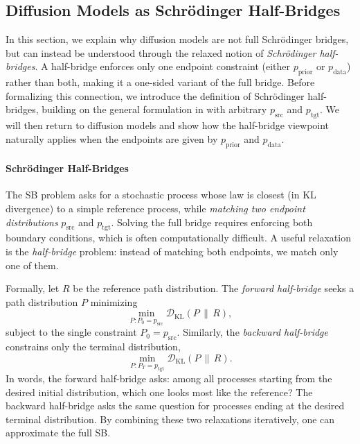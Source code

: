 
\subsection{Diffusion Models as Schrödinger Half-Bridges}

In this section, we explain why diffusion models are not full Schr\"odinger bridges, 
but can instead be understood through the relaxed notion of \emph{Schr\"odinger half-bridges}. 
A half-bridge enforces only one endpoint constraint (either $p_{\mathrm{prior}}$ or $p_{\mathrm{data}}$) rather than both, 
making it a one-sided variant of the full bridge. 
Before formalizing this connection, we introduce the definition of Schr\"odinger half-bridges, 
building on the general formulation in  with arbitrary $p_{\mathrm{src}}$ and $p_{\mathrm{tgt}}$. 
We will then return to diffusion models and show how the half-bridge viewpoint naturally applies when the 
endpoints are given by $p_{\mathrm{prior}}$ and $p_{\mathrm{data}}$.



\paragraph{Schrödinger Half-Bridges}

The SB problem asks for a stochastic process whose law is
closest (in KL divergence) to a simple reference process, while \emph{matching
two endpoint distributions} $p_{\mathrm{src}}$ and $p_{\mathrm{tgt}}$.
Solving the full bridge requires enforcing both boundary conditions,
which is often computationally difficult. A useful relaxation is the
\emph{half-bridge} problem: instead of matching both endpoints, we match
only one of them. 

Formally, let $R$ be the reference path distribution. 
The \emph{forward half-bridge} seeks a path distribution $P$ minimizing
\[
    \min_{P: P_0 = p_{\mathrm{src}}}
    \mathcal{D}_{\mathrm{KL}}(P \,\|\, R),
\]
subject to the single constraint $P_0 = p_{\mathrm{src}}$. 
Similarly, the \emph{backward half-bridge} constrains only the terminal
distribution,
\[
    \min_{P: P_T = p_{\mathrm{tgt}}}
    \mathcal{D}_{\mathrm{KL}}(P \,\|\, R).
\]
In words, the forward half-bridge asks: among all processes starting
from the desired initial distribution, which one looks most like the
reference? The backward half-bridge asks the same question for processes
ending at the desired terminal distribution. By combining these two
relaxations iteratively, one can approximate the full SB.





